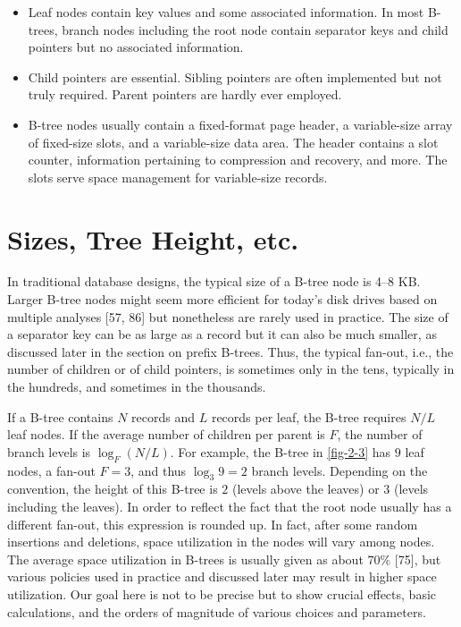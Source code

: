 \begin{itemize}
\item
  Leaf nodes contain key values and some associated information. In most
  B-trees, branch nodes including the root node contain separator keys
  and child pointers but no associated information.
\item
  Child pointers are essential. Sibling pointers are often implemented
  but not truly required. Parent pointers are hardly ever employed.
\item
  B-tree nodes usually contain a fixed-format page header, a
  variable-size array of fixed-size slots, and a variable-size data
  area. The header contains a slot counter, information pertaining to
  compression and recovery, and more. The slots serve space management
  for variable-size records.
\end{itemize}

\hypertarget{sizes-tree-height-etc.}{%
\section{Sizes, Tree Height, etc.}\label{sizes-tree-height-etc.}}

In traditional database designs, the typical size of a B-tree node is
4--8 KB. Larger B-tree nodes might seem more efficient for today's disk
drives based on multiple analyses {[}57, 86{]} but nonetheless are
rarely used in practice. The size of a separator key can be as large as
a record but it can also be much smaller, as discussed later in the
section on prefix B-trees. Thus, the typical fan-out, i.e., the number
of children or of child pointers, is sometimes only in the tens,
typically in the hundreds, and sometimes in the thousands.

If a B-tree contains $N$ records and $L$ records per leaf, the
B-tree requires $N/L$ leaf nodes. If the average number of children
per parent is $F$, the number of branch levels is
$\log_F(N/L)$. For example, the B-tree in
\autoref{fig-2-3} has $9$ leaf nodes, a fan-out $F = 3$, and thus
$\log_3 9 = 2$ branch levels. Depending on the convention,
the height of this B-tree is $2$ (levels above the leaves) or $3$ (levels
including the leaves). In order to reflect the fact that the root node
usually has a different fan-out, this expression is rounded up. In fact,
after some random insertions and deletions, space utilization in the
nodes will vary among nodes. The average space utilization in B-trees is
usually given as about $70\%$ {[}75{]}, but various policies used in
practice and discussed later may result in higher space utilization. Our
goal here is not to be precise but to show crucial effects, basic
calculations, and the orders of magnitude of various choices and
parameters.

